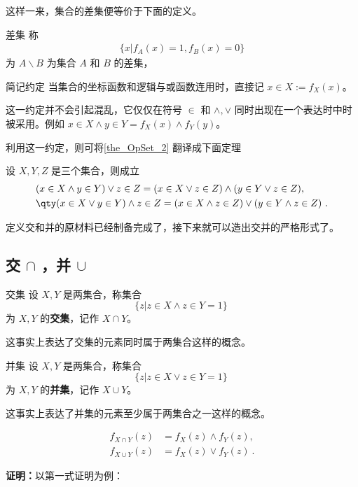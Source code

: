 这样一来，集合的差集便等价于下面的定义。
\begin{definition}{差集}
称
\begin{equation}
\begin{aligned}
\{x|f_A(x)=1,f_B(x)=0\}
\end{aligned}
\end{equation}
为 $A\backslash B$ 为集合 $A$ 和 $B$ 的差集，
\end{definition}
\begin{definition}{简记约定}\label{def_OpSet_5}
当集合的坐标函数和逻辑与或函数连用时，直接记 $x\in X:=f_X(x)$。
\end{definition}
这一约定并不会引起混乱，它仅仅在符号 $\in$ 和 $\land,\lor$ 同时出现在一个表达时中时被采用。例如 $x\in X\land y\in Y=f_X(x)\land f_Y(y)$。

利用这一约定，则可将\autoref{the_OpSet_2}  翻译成下面定理
\begin{theorem}{}\label{the_OpSet_4}
设 $X,Y,Z$ 是三个集合，则成立
\begin{equation}
\begin{aligned}
&(x\in X\land y\in Y)\lor z\in Z=(x\in X\lor z\in Z)\land(y\in Y\lor z\in Z),\\
&\qty(x\in X\lor y\in Y)\land z\in Z=(x\in X\land z\in Z)\lor(y\in Y\land z\in Z)~.
\end{aligned}
\end{equation}
\end{theorem}

定义交和并的原材料已经制备完成了，接下来就可以造出交并的严格形式了。
\subsection{交 $\cap$ ，并 $\cup$}
\begin{definition}{交集}\label{def_OpSet_3}
设 $X,Y$ 是两集合，称集合
\begin{equation}\label{eq_OpSet_4}
\{z|z\in X\land z\in Y=1 \}~
\end{equation}
为 $X,Y$ 的\textbf{交集}，记作 $X\cap Y$。
\end{definition}
这事实上表达了交集的元素同时属于两集合这样的概念。
\begin{definition}{并集}\label{def_OpSet_4}
设 $X,Y$ 是两集合，称集合
\begin{equation}
\{z|z\in X\lor z\in Y=1 \}~
\end{equation}
为 $X,Y$ 的\textbf{并集}，记作 $X\cup Y$。
\end{definition}
这事实上表达了并集的元素至少属于两集合之一这样的概念。
\begin{theorem}{}\label{the_OpSet_3}
\begin{equation}
\begin{aligned}
f_{X\cap Y}(z)&=f_X(z)\land f_Y(z),\\
f_{X\cup Y}(z)&=f_X(z)\lor f_Y(z)~.
\end{aligned}
\end{equation}
\end{theorem}
\textbf{证明：}以第一式证明为例：

